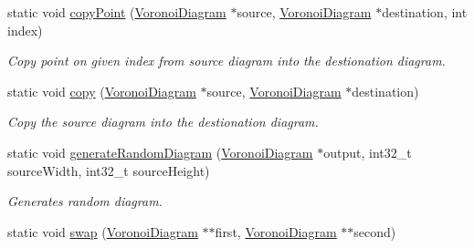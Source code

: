 \begin{DoxyCompactItemize}
\item 
static void \hyperlink{classlossycompressor_1_1_compressor_utils_a5b0e35fe3f5907d16f354be1ae986cd5}{copy\+Point} (\hyperlink{structlossycompressor_1_1_voronoi_diagram}{Voronoi\+Diagram} $\ast$source, \hyperlink{structlossycompressor_1_1_voronoi_diagram}{Voronoi\+Diagram} $\ast$destination, int index)\hypertarget{classlossycompressor_1_1_compressor_utils_a5b0e35fe3f5907d16f354be1ae986cd5}{}\label{classlossycompressor_1_1_compressor_utils_a5b0e35fe3f5907d16f354be1ae986cd5}

\begin{DoxyCompactList}\small\item\em Copy point on given index from source diagram into the destionation diagram. \end{DoxyCompactList}\item 
static void \hyperlink{classlossycompressor_1_1_compressor_utils_add0142376a99e9c052b6b9abfa4ec750}{copy} (\hyperlink{structlossycompressor_1_1_voronoi_diagram}{Voronoi\+Diagram} $\ast$source, \hyperlink{structlossycompressor_1_1_voronoi_diagram}{Voronoi\+Diagram} $\ast$destination)\hypertarget{classlossycompressor_1_1_compressor_utils_add0142376a99e9c052b6b9abfa4ec750}{}\label{classlossycompressor_1_1_compressor_utils_add0142376a99e9c052b6b9abfa4ec750}

\begin{DoxyCompactList}\small\item\em Copy the source diagram into the destionation diagram. \end{DoxyCompactList}\item 
static void \hyperlink{classlossycompressor_1_1_compressor_utils_a8115bf54770caaa0a345daccd29542c9}{generate\+Random\+Diagram} (\hyperlink{structlossycompressor_1_1_voronoi_diagram}{Voronoi\+Diagram} $\ast$output, int32\+\_\+t source\+Width, int32\+\_\+t source\+Height)\hypertarget{classlossycompressor_1_1_compressor_utils_a8115bf54770caaa0a345daccd29542c9}{}\label{classlossycompressor_1_1_compressor_utils_a8115bf54770caaa0a345daccd29542c9}

\begin{DoxyCompactList}\small\item\em Generates random diagram. \end{DoxyCompactList}\item 
static void \hyperlink{classlossycompressor_1_1_compressor_utils_a06515562c64990788ecba2f071b553e8}{swap} (\hyperlink{structlossycompressor_1_1_voronoi_diagram}{Voronoi\+Diagram} $\ast$$\ast$first, \hyperlink{structlossycompressor_1_1_voronoi_diagram}{Voronoi\+Diagram} $\ast$$\ast$second)\hypertarget{classlossycompressor_1_1_compressor_utils_a06515562c64990788ecba2f071b553e8}{}\label{classlossycompressor_1_1_compressor_utils_a06515562c64990788ecba2f071b553e8}


\end{DoxyCompactItemize}

